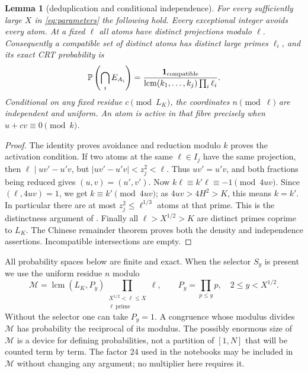\documentclass[10pt,reqno]{amsart}
\newtheorem{lemma}[theorem]{Lemma}
\theoremstyle{remark}
\newcommand{\Prob}{\mathbb P}
\newcommand{\ind}{\mathbf1}
\newcommand{\lcm}{\operatorname{lcm}}
\begin{document}
\begin{lemma}[deduplication and conditional independence]\label{lem:CRT}
For every sufficiently large $X$ in \eqref{eq:parameters} the following hold.
Every exceptional integer avoids every atom.  At a fixed $\ell$ all
atoms have distinct projections modulo $\ell$.  Consequently a compatible
set of distinct atoms has distinct large primes $\ell_i$, and its exact
CRT probability is
\begin{equation}\label{eq:intersection}
 \Prob\left(\bigcap_i E_{A_i}\right)
 =\frac{\ind_{\rm compatible}}
 {\lcm(k_1,\ldots,k_j)\prod_i\ell_i}.
\end{equation}
Conditional on any fixed residue $c\pmod{L_K}$, the coordinates
$n\pmod\ell$ are independent and uniform.  An atom is active in that
fibre precisely when $u+cv\equiv0\pmod k$.
\end{lemma}
\begin{proof}
The identity proves avoidance and reduction modulo $k$ proves the activation
condition.  If two atoms at the same $\ell\in I_j$ have the same projection,
then $\ell\mid uv'-u'v$, but $|uv'-u'v|<z_j^2<\ell$.
Thus $uv'=u'v$, and both fractions being reduced gives $(u,v)=(u',v')$.
Now $k\ell\equiv k'\ell\equiv-1\pmod{4uv}$.  Since $(\ell,4uv)=1$,
we get $k\equiv k'\pmod{4uv}$; as $4uv>4H^2>K$, this means $k=k'$.
In particular there are at most $z_j^2\leq\ell^{1/3}$ atoms at that prime.
This is the distinctness argument of \cite[Lemma~4.1]{LL}.
Finally all $\ell>X^{1/2}>K$ are distinct primes coprime to $L_K$.
The Chinese remainder theorem proves both the density and independence
assertions.  Incompatible intersections are empty.
\end{proof}

All probability spaces below are finite and exact.  When the selector
$S_y$ is present we use the uniform residue $n$ modulo
\begin{equation}\label{eq:space}
 \mathcal M=\lcm(L_K,P_y)\prod_{\substack{X^{1/2}<\ell\leq X\\\ell\ \mathrm{prime}}}\ell,
 \qquad P_y=\prod_{p\leq y}p,\quad 2\leq y<X^{1/2}.
\end{equation}
Without the selector one can take $P_y=1$.  A congruence whose modulus
 divides $\mathcal M$ has probability the reciprocal of its modulus.
The possibly enormous size of $\mathcal M$ is a device for defining
probabilities, not a partition of $[1,N]$ that will be counted term by term.
The factor 24 used in the notebooks may be included in $\mathcal M$ without
changing any argument; no multiplier here requires it.
\end{document}
